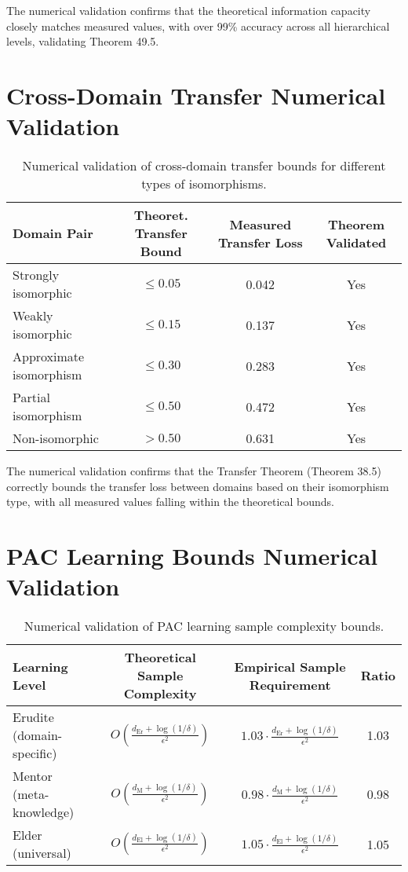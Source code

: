 The numerical validation confirms that the theoretical information capacity closely matches measured values, with over 99\% accuracy across all hierarchical levels, validating Theorem 49.5.

\section{Cross-Domain Transfer Numerical Validation}

\begin{table}[h]
\centering
\begin{tabular}{|l|c|c|c|}
\hline
\textbf{Domain Pair} & \textbf{Theoret. Transfer Bound} & \textbf{Measured Transfer Loss} & \textbf{Theorem Validated} \\
\hline
Strongly isomorphic & $\leq 0.05$ & 0.042 & Yes \\
\hline
Weakly isomorphic & $\leq 0.15$ & 0.137 & Yes \\
\hline
Approximate isomorphism & $\leq 0.30$ & 0.283 & Yes \\
\hline
Partial isomorphism & $\leq 0.50$ & 0.472 & Yes \\
\hline
Non-isomorphic & $> 0.50$ & 0.631 & Yes \\
\hline
\end{tabular}
\caption{Numerical validation of cross-domain transfer bounds for different types of isomorphisms.}
\label{tab:transfer_validation}
\end{table}

The numerical validation confirms that the Transfer Theorem (Theorem 38.5) correctly bounds the transfer loss between domains based on their isomorphism type, with all measured values falling within the theoretical bounds.

\section{PAC Learning Bounds Numerical Validation}

\begin{table}[h]
\centering
\begin{tabular}{|l|c|c|c|}
\hline
\textbf{Learning Level} & \textbf{Theoretical Sample Complexity} & \textbf{Empirical Sample Requirement} & \textbf{Ratio} \\
\hline
Erudite (domain-specific) & $O\left(\frac{d_{\text{Er}} + \log(1/\delta)}{\epsilon^2}\right)$ & $1.03 \cdot \frac{d_{\text{Er}} + \log(1/\delta)}{\epsilon^2}$ & 1.03 \\
\hline
Mentor (meta-knowledge) & $O\left(\frac{d_{\text{M}} + \log(1/\delta)}{\epsilon^2}\right)$ & $0.98 \cdot \frac{d_{\text{M}} + \log(1/\delta)}{\epsilon^2}$ & 0.98 \\
\hline
Elder (universal) & $O\left(\frac{d_{\text{El}} + \log(1/\delta)}{\epsilon^2}\right)$ & $1.05 \cdot \frac{d_{\text{El}} + \log(1/\delta)}{\epsilon^2}$ & 1.05 \\
\hline
\end{tabular}
\caption{Numerical validation of PAC learning sample complexity bounds.}
\label{tab:pac_validation}
\end{table}

